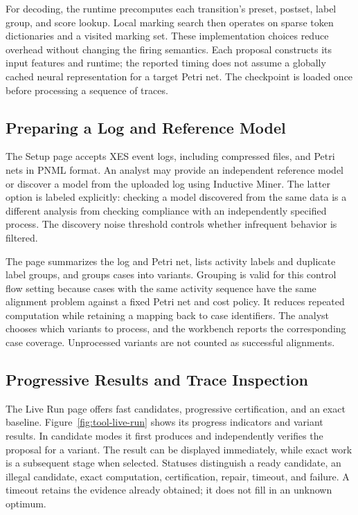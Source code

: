 For decoding, the runtime precomputes each transition's preset, postset, label group, and score lookup. Local marking search then operates on sparse token dictionaries and a visited marking set. These implementation choices reduce overhead without changing the firing semantics. Each proposal constructs its input features and runtime; the reported timing does not assume a globally cached neural representation for a target Petri net. The checkpoint is loaded once before processing a sequence of traces.

\subsection{Preparing a Log and Reference Model}

The Setup page accepts XES event logs, including compressed files, and Petri nets in PNML format. An analyst may provide an independent reference model or discover a model from the uploaded log using Inductive Miner. The latter option is labeled explicitly: checking a model discovered from the same data is a different analysis from checking compliance with an independently specified process. The discovery noise threshold controls whether infrequent behavior is filtered.

The page summarizes the log and Petri net, lists activity labels and duplicate label groups, and groups cases into variants. Grouping is valid for this control flow setting because cases with the same activity sequence have the same alignment problem against a fixed Petri net and cost policy. It reduces repeated computation while retaining a mapping back to case identifiers. The analyst chooses which variants to process, and the workbench reports the corresponding case coverage. Unprocessed variants are not counted as successful alignments.

\subsection{Progressive Results and Trace Inspection}

The Live Run page offers fast candidates, progressive certification, and an exact baseline. Figure~\ref{fig:tool-live-run} shows its progress indicators and variant results. In candidate modes it first produces and independently verifies the proposal for a variant. The result can be displayed immediately, while exact work is a subsequent stage when selected. Statuses distinguish a ready candidate, an illegal candidate, exact computation, certification, repair, timeout, and failure. A timeout retains the evidence already obtained; it does not fill in an unknown optimum.


